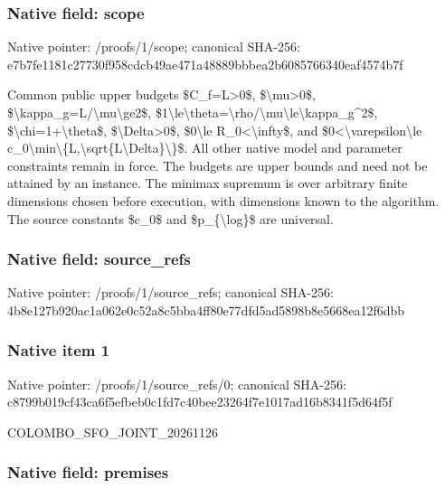\documentclass[10pt,a4paper]{article}
\begin{document}
\subsubsection{Native field: scope}


Native pointer: /proofs/1/scope; canonical SHA-256: e7b7fe1181c27730f958cdcb\allowbreak{}49ae471a48889bbbea2b6085\allowbreak{}766340eaf4574b7f


Common public upper budgets \$C\_f=L>0\$, \$\textbackslash{}mu>0\$, \$\textbackslash{}kappa\_g=L/\textbackslash{}mu\textbackslash{}ge2\$, \$1\textbackslash{}le\textbackslash{}theta=\textbackslash{}rho/\textbackslash{}mu\textbackslash{}le\textbackslash{}kappa\_g\textasciicircum{}2\$, \$\textbackslash{}chi=1+\textbackslash{}theta\$, \$\textbackslash{}Delta>0\$, \$0\textbackslash{}le R\_0<\textbackslash{}infty\$, and \$0<\textbackslash{}varepsilon\textbackslash{}le c\_0\textbackslash{}min\textbackslash{}\{L,\textbackslash{}sqrt\{L\textbackslash{}Delta\}\textbackslash{}\}\$. All other native model and parameter constraints remain in force. The budgets are upper bounds and need not be attained by an instance. The minimax supremum is over arbitrary finite dimensions chosen before execution, with dimensions known to the algorithm. The source constants \$c\_0\$ and \$p\_\{\textbackslash{}log\}\$ are universal.


\subsubsection{Native field: source\_refs}


Native pointer: /proofs/1/source\_refs; canonical SHA-256: 4b8e127b920ac1a062e0c52a\allowbreak{}8c5bba4ff80e77dfd5ad5898\allowbreak{}b8e5668ea12f6dbb



\subsubsection{Native item 1}


Native pointer: /proofs/1/source\_refs/0; canonical SHA-256: c8799b019cf43ca6f5efbeb0\allowbreak{}c1fd7c40bee23264f7e1017a\allowbreak{}d16b8341f5d64f5f


COLOMBO\_SFO\_JOINT\_20261126


\subsubsection{Native field: premises}
\end{document}

